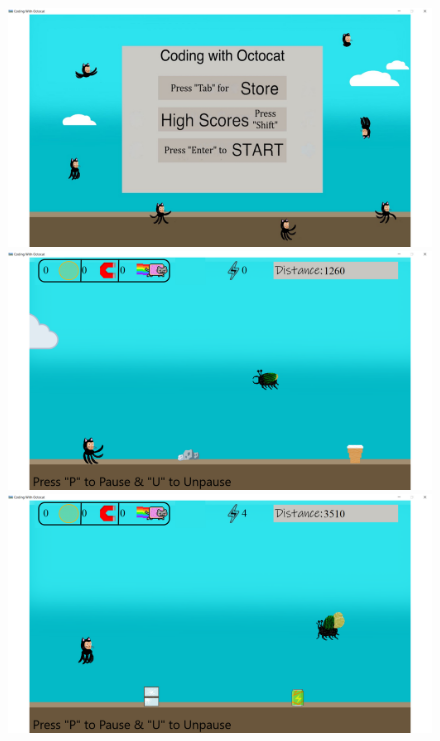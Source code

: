 \documentclass[10pt,conference,onecolumn,compsoc]{IEEEtran}
\begin{document}
\begin{figure}[!ht] 
\centering
\includegraphics[scale=.2]{StartMenu.png}
\caption{}

\includegraphics[scale=.2]{In-Game1.png}
\caption{}

\includegraphics[scale=.2]{In-Game2.png}
\caption{}
\end{figure}
\end{document}
